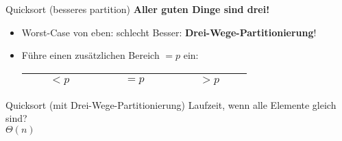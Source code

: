 \begin{frame}{Quicksort (besseres partition)}
	\textbf{Aller guten Dinge sind drei!} \\
	\begin{itemize}
		\item Worst-Case von eben: schlecht \frownie
		\pause
		\implitem Besser: \textbf{Drei-Wege-Partitionierung}!
		\item Führe einen zusätzlichen Bereich $ = p$ ein: \\
		\begin{tabular}{|c|c|c|}
			\hline
			$\qquad < p \qquad$ & \cellcolor{cyan!50} $\qquad = p \qquad$ & $\qquad > p \qquad$ \\
			\hline
		\end{tabular} 
	\end{itemize}
\end{frame}



\begin{frame}{{\vspace{.3\baselineskip}Quicksort (mit Drei-Wege-Partitionierung)}}
	Laufzeit, wenn alle Elemente gleich sind? \\
	\pause
	\impl $\Theta(n)$
\end{frame}

